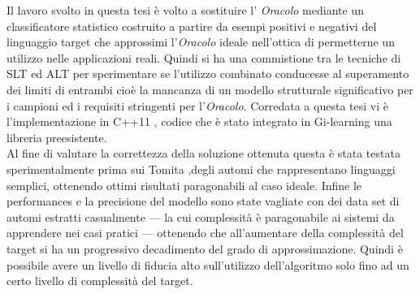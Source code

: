 Il lavoro svolto in questa tesi è volto a sostituire l' \textit{Oracolo} mediante un classificatore statistico costruito a partire da esempi positivi e negativi del linguaggio target che approssimi l'\textit{Oracolo} ideale nell'ottica di permetterne un utilizzo nelle applicazioni reali.  Quindi si ha una commistione tra le tecniche di SLT ed ALT per sperimentare se l'utilizzo combinato conducesse al superamento dei limiti di entrambi cioè la mancanza di un modello strutturale significativo per i campioni ed i requisiti stringenti per l'\textit{Oracolo}.
Corredata a questa tesi vi è  l'implementazione in C++11 , codice che è stato integrato in  Gi-learning \cite{Cot16} una libreria preesistente.\\
Al fine di valutare la correttezza della soluzione ottenuta  questa è stata testata sperimentalmente prima sui Tomita \cite{Tomita82} \cite{Dupont94} ,degli automi che rappresentano linguaggi semplici, ottenendo ottimi risultati paragonabili al caso ideale.
Infine le performances e la precisione  del modello sono state vagliate con dei data set di automi estratti casualmente --- la cui complessità è paragonabile ai sistemi da apprendere nei casi pratici --- ottenendo che all'aumentare della complessità del target si ha un progressivo decadimento del grado di approssimazione. Quindi è possibile avere un livello di fiducia alto sull'utilizzo dell'algoritmo solo fino ad un certo livello di complessità del target.

